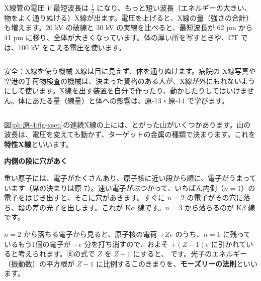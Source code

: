 \begin{phbaisuru}{X線管の電圧 $V$}
最短波長は $\tfrac12$ になり、もっと短い波長（エネルギーの大きい、物をよく通りぬける）X線が出ます。電圧を上げると、X線の量（強さの合計）も増えます。20 kV の破線と 30 kV の実線を比べると、最短波長が 62 pm から 41 pm に移り、全体が大きくなっています。体の厚い所を写すときや、CT では、100 kV をこえる電圧を使います。
\end{phbaisuru}

\begin{column}{安全：X線を使う機械}
X線は目に見えず、体を通りぬけます。病院の X線写真や空港の手荷物検査の機械は、決まった資格のある人が、X線が外にもれないようにして使います。X線を出す装置を自分で作ったり、動かしたりしてはいけません。体にあたる量（線量）と体への影響は、原-13・原-14 で学びます。
\end{column}

\label{ph:原-4:sec10}
図\ref{ph:原-4:fig-xsen}の連続X線の上には、とがった山がいくつかあります。山の波長は、電圧を変えても動かず、ターゲットの金属の種類で決まります。これを\textbf{特性X線}といいます。

\noindent\textbf{内側の段に穴があく}\par\nobreak
重い原子には、電子がたくさんあり、原子核に近い段から順に、電子がうまっています（席の決まりは原-7）。速い電子がぶつかって、いちばん内側（$n=1$）の電子をはじき出すと、そこに穴があきます。すぐに $n=2$ の電子がその穴に落ち、段の差の光子を出します。これが K$\alpha$ 線です。$n=3$ から落ちるのが K$\beta$ 線です。

$n=2$ から落ちる電子から見ると、原子核の電荷 $+Ze$ のうち、$n=1$ に残っているもう1個の電子が $-e$ 分を打ち消すので、およそ $+(Z-1)e$ に引かれていると考えられます。⑧の式で $Z$ を $Z-1$ にすると、
\label{ph:原-4:moseley}です。光子のエネルギー（振動数）の平方根が $Z-1$ に比例するこのきまりを、\textbf{モーズリーの法則}といいます。

